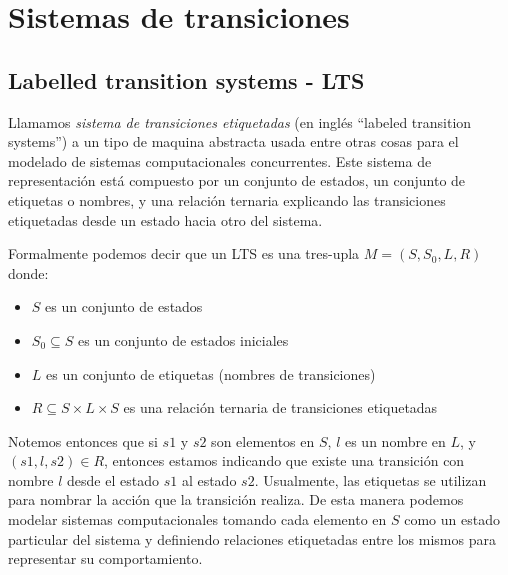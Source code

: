 \documentclass[titlepage, 12pt]{book}
\begin{document}




\section{Sistemas de transiciones}
\label{LTSaK}

\subsection*{Labelled transition systems - LTS}

Llamamos \textit{sistema de transiciones etiquetadas} (en ingl\'es ``labeled transition systems'') a un tipo de maquina abstracta usada entre otras cosas para el modelado de sistemas computacionales concurrentes. Este sistema de representaci\'on est\'a compuesto por un conjunto de estados, un conjunto de etiquetas o nombres, y una relaci\'on ternaria explicando las transiciones etiquetadas desde un estado hacia otro del sistema.

Formalmente podemos decir que un LTS es una tres-upla $M = (S,S_{0},L,R)$ donde:
\begin{itemize}
\item $S$ es un conjunto de estados
\item $S_0 \subseteq S$ es un conjunto de estados iniciales
\item $L$ es un conjunto de etiquetas (nombres de transiciones)
\item $R \subseteq S \times L \times S$ es una relaci\'on ternaria de transiciones etiquetadas
\end{itemize}
Notemos entonces que si $s1$ y $s2$ son elementos en $S$, $l$ es un nombre en $L$, y $(s1,l,s2) \in R$, entonces estamos indicando que existe una transici\'on con nombre $l$ desde el estado $s1$ al estado $s2$. Usualmente, las etiquetas se utilizan para nombrar la acci\'on que la transici\'on realiza. De esta manera podemos modelar sistemas computacionales tomando cada elemento en $S$ como un estado particular del sistema y definiendo relaciones etiquetadas entre los mismos para representar su comportamiento.
\end{document}
